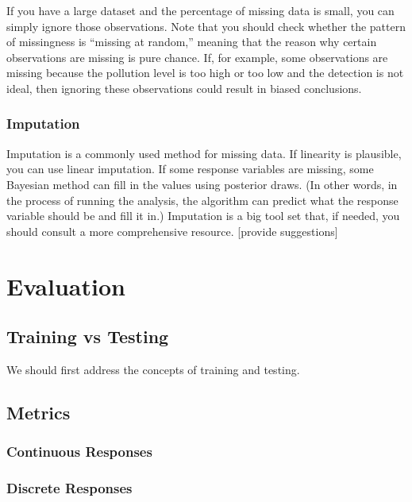 \documentclass[
]{book}
\begin{document}
If you have a large dataset and the percentage of missing data is small, you can simply ignore those observations. Note that you should check whether the pattern of missingness is ``missing at random,'' meaning that the reason why certain observations are missing is pure chance. If, for example, some observations are missing because the pollution level is too high or too low and the detection is not ideal, then ignoring these observations could result in biased conclusions.

\hypertarget{imputation}{%
\subsection{Imputation}\label{imputation}}

Imputation is a commonly used method for missing data. If linearity is plausible, you can use linear imputation. If some response variables are missing, some Bayesian method can fill in the values using posterior draws. (In other words, in the process of running the analysis, the algorithm can predict what the response variable should be and fill it in.) Imputation is a big tool set that, if needed, you should consult a more comprehensive resource. {[}provide suggestions{]}

\hypertarget{evaluation}{%
\chapter{Evaluation}\label{evaluation}}

\hypertarget{training-vs-testing}{%
\section{Training vs Testing}\label{training-vs-testing}}

We should first address the concepts of training and testing.

\hypertarget{metrics}{%
\section{Metrics}\label{metrics}}

\hypertarget{continuous-responses}{%
\subsection{Continuous Responses}\label{continuous-responses}}

\hypertarget{discrete-responses}{%
\subsection{Discrete Responses}\label{discrete-responses}}
\end{document}
